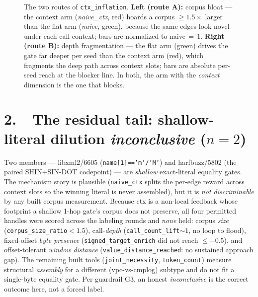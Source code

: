 \documentclass[11pt]{article}
\begin{document}
\begin{figure}[t]
\begin{minipage}[b]{0.46\linewidth}
\end{minipage}
\caption{The two routes of \texttt{ctx\_inflation}. \textbf{Left (route A):} corpus
bloat --- the context arm (\emph{naive\_ctx}, red) hoards a corpus $\ge1.5\times$ larger
than the flat arm (\emph{naive}, green), because the same edges look novel under
each call-context; bars are normalized to naive$\,{=}\,1$. \textbf{Right (route B):}
depth fragmentation --- the flat arm (green) drives the gate far deeper
per seed than the context arm (red), which fragments the deep path across context
slots; bars are absolute per-seed reach at the blocker line. In both, the arm with
the \emph{context} dimension is the one that blocks.}
\label{fig:ctx-anti}
\end{figure}

\section*{2.\ \ The residual tail: shallow-literal dilution \hfill {\normalsize\emph{inconclusive} ($n=2$)}}
Two members --- libxml2/6605 (\texttt{name[1]=='m'/'M'}) and harfbuzz/5802 (the
paired SHIN+SIN-DOT codepoint) --- are \emph{shallow} exact-literal equality
gates. The mechanism story is plausible (\texttt{naive\_ctx} splits the per-edge
reward across context slots so the winning literal is never assembled), but it is
\emph{not discriminable} by any built corpus measurement. Because ctx is a
non-local feedback whose footprint a shallow 1-hop gate's corpus does not
preserve, all four permitted handles were scored across the labeling rounds and
\emph{none} held: corpus \emph{size} (\texttt{corpus\_size\_ratio}$<1.5$),
call-\emph{depth} (\texttt{call\_count\_lift}$\sim1$, no loop to flood),
fixed-offset \emph{byte presence} (\texttt{signed\_target\_enrich} did not reach
$\le-0.5$), and offset-tolerant \emph{window distance}
(\texttt{value\_distance\_reached}: no sustained approach gap). The remaining
built tools (\texttt{joint\_necessity}, \texttt{token\_count}) measure structural
\emph{assembly} for a different (vpc-vs-cmplog) subtype and do not fit a
single-byte equality gate. Per guardrail G3, an honest \emph{inconclusive} is the
correct outcome here, not a forced label.

\end{document}
